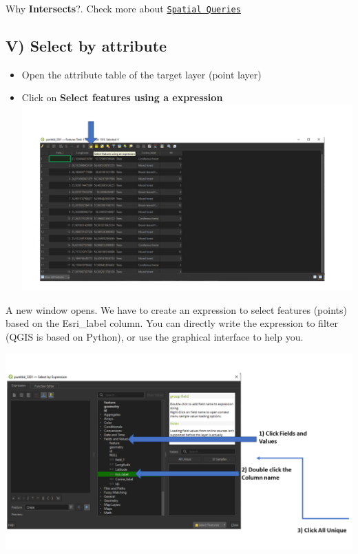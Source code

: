\documentclass[
  letterpaper,
  DIV=11,
  numbers=noendperiod]{scrartcl}
\providecommand{\tightlist}{%
  \setlength{\itemsep}{0pt}\setlength{\parskip}{0pt}}\usepackage{longtable,booktabs,array}
\begin{document}
\begin{tcolorbox}[enhanced jigsaw, colbacktitle=quarto-callout-tip-color!10!white, toptitle=1mm, opacityback=0, bottomtitle=1mm, bottomrule=.15mm, leftrule=.75mm, coltitle=black, left=2mm, arc=.35mm, title=\textcolor{quarto-callout-tip-color}{\faLightbulb}\hspace{0.5em}{}, breakable, colframe=quarto-callout-tip-color-frame, opacitybacktitle=0.6, rightrule=.15mm, toprule=.15mm, titlerule=0mm, colback=white]
Why \textbf{Intersects}?. Check more about
\href{https://postgis.net/docs/using_postgis_query.html\#general-spatial-rel}{\texttt{Spatial\ Queries}}
\end{tcolorbox}

\hypertarget{v-select-by-attribute}{%
\subsection{V) Select by attribute}\label{v-select-by-attribute}}

\begin{itemize}
\tightlist
\item
  Open the attribute table of the target layer (point layer)
\item
  Click on \textbf{Select features using a expression}
  \includegraphics{Lab1/qgis_ss/QGIS_ss16.png}
\end{itemize}

A new window opens. We have to create an expression to select features
(points) based on the Esri\_label column. You can directly write the
expression to filter (QGIS is based on Python), or use the graphical
interface to help you.

\includegraphics{Lab1/qgis_ss/QGIS_ss17.png}
\end{document}
